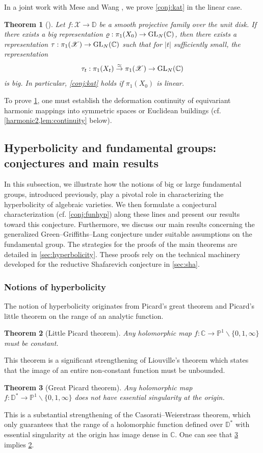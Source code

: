 \documentclass[english]{amsproc}
\theoremstyle{plain}
\newtheorem{thm}{Theorem}[section]
\theoremstyle{definition}
\theoremstyle{remark}
\theoremstyle{plain}
\numberwithin{equation}{thm} %
\newcommand{\sX}{\mathscr{X}}
\newcommand{\bC}{\mathbb{C}}
\newcommand{\bD}{\mathbb{D}}
\newcommand{\bP}{\mathbb{P}}
\newcommand{\GL}{{\rm GL}}
\begin{document}
In a joint work with Mese and Wang  \cite{DMW24}, we prove \cref{conj:kat} in the linear case. 
\begin{thm}[\cite{DMW24}]\label{conj:deformation}
	Let $f:\sX\to\bD$ be a smooth projective family over the unit disk. If there exists a big representation $\varrho:\pi_1(X_0)\to \GL_N(\bC)$, then there exists a representation $\tau:\pi_1(\sX)\to\GL_{N}(\bC)$ such that   for $|t| $ sufficiently small, the representation
	$$
	\tau_t: \pi_1(X_t)\stackrel{\simeq}{\to}\pi_1(\sX)\to \GL_N(\bC)
	$$ 
	is big. In particular, 
	\cref{conj:kat} holds if $\pi_1(X_0)$ is linear. 
\end{thm}
To prove \cref{conj:deformation}, one must establish the deformation continuity of equivariant harmonic mappings into symmetric spaces or Euclidean buildings (cf. \cref{harmonic2,lem:continuity} below).

\subsection{Hyperbolicity and fundamental groups: conjectures and main results}\label{sec:hyper}

In this subsection, we illustrate how the notions of  {big} or  {large} fundamental groups, introduced previously, play a pivotal role in characterizing the hyperbolicity of algebraic varieties. We then formulate a conjectural characterization (cf. \cref{conj:funhyp}) along these lines and present our results toward this conjecture. Furthermore, we discuss our main results concerning the generalized Green--Griffiths--Lang conjecture under suitable assumptions on the fundamental group. The strategies for the proofs of the main theorems are detailed in \cref{sec:hyperbolicity}. These proofs rely on the technical machinery developed for the reductive Shafarevich conjecture in \cref{sec:sha}. 
\subsubsection{Notions of hyperbolicity}
The notion of hyperbolicity  originates from Picard's great theorem and Picard's little theorem on  the range of an analytic function.  
\begin{thm}[Little Picard theorem]\label{thm:little}
	Any holomorphic map  $f:\bC\to \bP^1\backslash\{0,1,\infty\}$  must be constant.  
\end{thm}
This  theorem is a significant strengthening of Liouville's theorem which states that the image of an entire non-constant function must be unbounded. 
\begin{thm}[Great Picard theorem]\label{thm:great}
	Any holomorphic map  $f:\bD^*\to \bP^1\backslash\{0,1,\infty\}$   does not have essential singularity at the origin. 
\end{thm}
This is a substantial strengthening of the Casorati–Weierstrass theorem, which only guarantees that the range of  a holomorphic function defined over $\bD^*$ with essential singularity at the origin has image  dense in $\bC$.  One can see that \cref{thm:great} implies \cref{thm:little}. 
\end{document}
